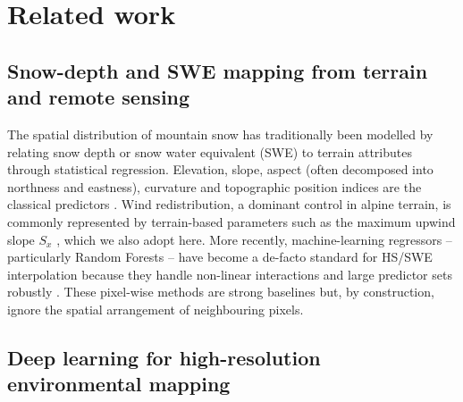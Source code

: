 \section{Related work}
\label{sec:related}

\subsection{Snow-depth and SWE mapping from terrain and remote sensing}

The spatial distribution of mountain snow has traditionally been modelled by
relating snow depth or snow water equivalent (SWE) to terrain attributes
through statistical regression. Elevation, slope, aspect (often decomposed
into northness and eastness), curvature and topographic position indices are
the classical predictors \citep{elder1991,molotch2005,revuelto2014}. Wind
redistribution, a dominant control in alpine terrain, is commonly represented
by terrain-based parameters such as the maximum upwind slope $S_x$
\citep{winstral2002,winstral2013}, which we also adopt here. More recently,
machine-learning regressors -- particularly Random Forests
\citep{breiman2001} -- have become a de-facto standard for HS/SWE
interpolation because they handle non-linear interactions and large predictor
sets robustly \citep{broxton2019,king2020,ntokas2021}. These pixel-wise
methods are strong baselines but, by construction, ignore the spatial
arrangement of neighbouring pixels.

\subsection{Deep learning for high-resolution environmental mapping}

